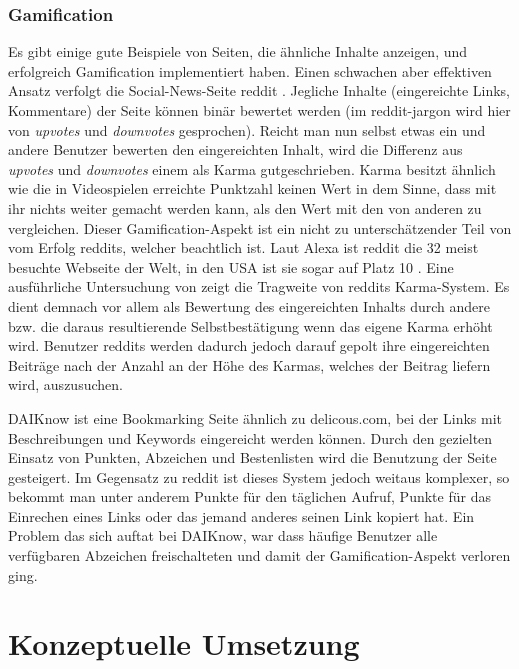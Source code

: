 \documentclass[12pt,twoside]{book}
\begin{document}
\subsection {Gamification}

Es gibt einige gute Beispiele von Seiten, die ähnliche Inhalte anzeigen, und erfolgreich Gamification implementiert haben. Einen schwachen aber effektiven Ansatz verfolgt die Social-News-Seite reddit \cite{reddit}. Jegliche Inhalte (eingereichte Links, Kommentare) der Seite können binär bewertet werden (im reddit-jargon wird hier von \textit{upvotes} und \textit{downvotes} gesprochen). Reicht man nun selbst etwas ein und andere Benutzer bewerten den eingereichten Inhalt, wird die Differenz aus \textit{upvotes} und \textit{downvotes} einem als Karma gutgeschrieben. Karma besitzt ähnlich wie die in Videospielen erreichte Punktzahl keinen Wert in dem Sinne, dass mit ihr nichts weiter gemacht werden kann, als den Wert mit den von anderen zu vergleichen.
Dieser Gamification-Aspekt ist ein nicht zu unterschätzender Teil von vom Erfolg reddits, welcher beachtlich ist. Laut Alexa ist reddit die 32 meist besuchte Webseite der Welt, in den USA ist sie sogar auf Platz 10 \cite{alexa}.
Eine ausführliche Untersuchung von \citep{richerichkarma} zeigt die Tragweite von reddits Karma-System. Es dient demnach vor allem als Bewertung des eingereichten Inhalts durch andere bzw. die daraus resultierende Selbstbestätigung wenn das eigene Karma erhöht wird.
Benutzer reddits werden dadurch jedoch darauf gepolt ihre eingereichten Beiträge nach der Anzahl an der Höhe des Karmas, welches der Beitrag liefern wird, auszusuchen.

DAIKnow \citep{meder2014daiknow} ist eine Bookmarking Seite ähnlich zu delicous.com\cite{delicious}, bei der Links mit Beschreibungen und Keywords eingereicht werden können. Durch den gezielten Einsatz von Punkten, Abzeichen und Bestenlisten wird die Benutzung der Seite gesteigert. Im Gegensatz zu reddit ist dieses System jedoch weitaus komplexer, so bekommt man unter anderem Punkte für den täglichen Aufruf, Punkte für das Einrechen eines Links oder das jemand anderes seinen Link kopiert hat.
Ein Problem das sich auftat bei DAIKnow, war dass häufige Benutzer alle verfügbaren Abzeichen freischalteten und damit der Gamification-Aspekt verloren ging.

\chapter{Konzeptuelle Umsetzung}\label{chap:concept}
\end{document}
